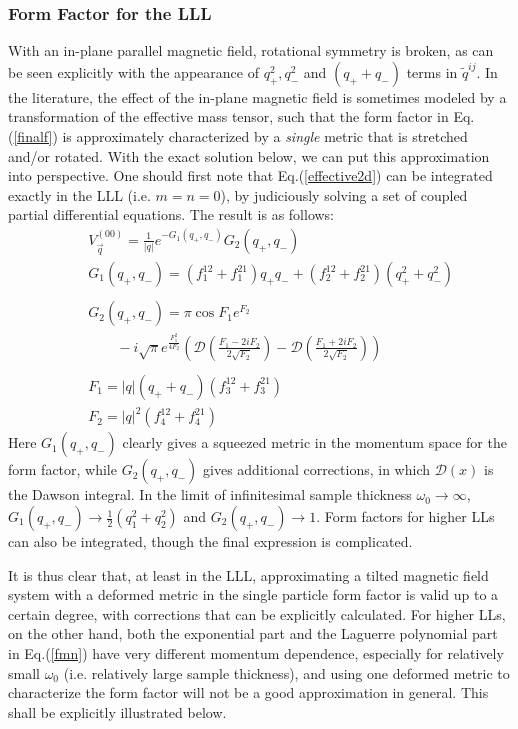 \documentclass[twocolumn,showpacs,amsmath,amstex,amssymb,mathfonts,prb]{revtex4-1}
\begin{document}
\subsubsection{Form Factor for the LLL}
With an in-plane parallel magnetic field, rotational symmetry is broken, as can be seen explicitly with the appearance of $q_+^2, q_-^{2}$ and $\left(q_++q_-\right)$ terms in $\tilde q^{ij}$. In the literature, the effect of the in-plane magnetic field is sometimes modeled by a transformation of the effective mass tensor, such that the form factor in Eq.(\ref{finalf}) is approximately characterized by a \emph{single} metric that is stretched and/or rotated. With the exact solution below, we can put this approximation into perspective. One should first note that Eq.(\ref{effective2d}) can be integrated exactly in the LLL (i.e. $m=n=0$), by judiciously solving a set of coupled partial differential equations. The result is as follows:
\begin{eqnarray}\label{v00}
&&V_{\vec q}^{\left(00\right)}=\frac{1}{|q|}e^{-G_1\left(q_+,q_-\right)}G_2\left(q_+,q_-\right)\\
&&G_1\left(q_+,q_-\right)=\left(f_1^{12}+f_1^{21}\right)q_+q_-+\left(f_2^{12}+f_2^{21}\right)\left(q_+^2+q_-^{2}\right)\nonumber\\ &&\\
&&G_2\left(q_+,q_-\right)=\pi\cos F_1e^{F_2}\nonumber\\
&&\qquad -i\sqrt\pi e^{\frac{F_1^2}{4F_2}}\left(\mathcal D\left(\frac{F_1-2iF_2}{2\sqrt{F_2}}\right)-\mathcal D\left(\frac{F_1+2iF_2}{2\sqrt{F_2}}\right)\right)\nonumber\\ &&\\
&&F_1=|q|\left(q_++q_-\right)\left(f_3^{12}+f_3^{21}\right)\\
&&F_2=|q|^2\left(f_4^{12}+f_4^{21}\right)
\end{eqnarray}
Here $G_1\left(q_+,q_-\right)$ clearly gives a squeezed metric in the momentum space for the form factor, while $G_2\left(q_+,q_-\right)$ gives additional corrections, in which $\mathcal D\left(x\right)$ is the Dawson integral\cite{handbook}. In the limit of infinitesimal sample thickness $\omega_0\rightarrow\infty$, $G_1\left(q_+,q_-\right)\rightarrow \frac{1}{2}\left(q_1^2+q_2^2\right)$ and $G_2\left(q_+,q_-\right)\rightarrow 1$. Form factors for higher LLs can also be integrated, though the final expression is complicated.

It is thus clear that, at least in the LLL, approximating a tilted magnetic field system with a deformed metric in the single particle form factor is valid up to a certain degree, with corrections that can be explicitly calculated. For higher LLs, on the other hand, both the exponential part and the Laguerre polynomial part  in Eq.(\ref{fmn}) have very different momentum dependence, especially for relatively small $\omega_0$ (i.e. relatively large sample thickness), and using one deformed metric to characterize the form factor will not be a good approximation in general. This shall be explicitly illustrated below.%
\end{document}
